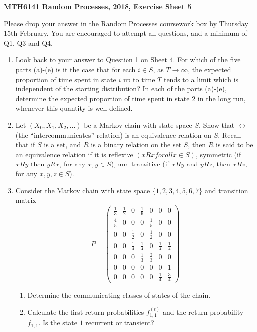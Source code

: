 \documentclass[11pt,a4paper]{report}
\begin{document}
    \textbf{MTH6141 Random Processes, 2018, Exercise Sheet 5}\par
    Please drop your answer in the Random Processes coursework box by Thursday 15th February. You are encouraged to attempt all questions, and a minimum of Q1, Q3 and Q4.
    \begin{enumerate}
        \item Look back to your answer to Question 1 on Sheet 4. For which of the five parts (a)-(e) is it the case that for each $i \in S$, as $T \to \infty$, the expected proportion of time spent in state $i$ up to time $T$ tends to a limit which is independent of the starting distribution? In each of the parts (a)-(e), determine the expected proportion of time spent in state $2$ in the long run, whenever this quantity is well defined.
        \item Let $(X_0, X_1, X_2, \ldots)$ be a Markov chain with state space $S$. Show that $\leftrightarrow$ (the “intercommunicates” relation) is an equivalence relation on $S$. Recall that if $S$ is a set, and $R$ is a binary relation on the set $S$, then $R$ is said to be an equivalence relation if it is reflexive $(xRx for all x \in S)$, symmetric (if $xRy$ then $yRx$, for any $x, y \in S$), and transitive (if $xRy$ and $yRz$, then $xRz$, for any $x, y, z \in S$).
        \item  Consider the Markov chain with state space $\{1, 2, 3, 4, 5, 6, 7\}$ and transition matrix
        $$
        P
        =
        \begin{pmatrix}
            \frac{1}{3} & \frac{1}{2} & 0 & \frac{1}{6} & 0 & 0 & 0\\
            \frac{4}{5} & 0 & 0 & 0 & \frac{1}{5} & 0 & 0\\
            0 & 0 & \frac{1}{2} & 0 & \frac{1}{2} & 0 & 0\\
            0 & 0 & \frac{1}{4} & \frac{1}{4} & 0 & \frac{1}{4} & \frac{1}{4}\\
            0 & 0 & 0 & \frac{1}{3} & \frac{2}{3} & 0 & 0\\
            0 & 0 & 0 & 0 & 0 & 0 & 1\\
            0 & 0 & 0 & 0 & 0 & \frac{1}{4} & \frac{3}{4}
        \end{pmatrix}
        $$
        \begin{enumerate}
            \item Determine the communicating classes of states of the chain.
            \item Calculate the first return probabilities $f^{(t)}_{1,1}$ and the return probability $f_{1,1}$. Is the state $1$ recurrent or transient?

\end{enumerate}
\end{enumerate}
\end{document}
